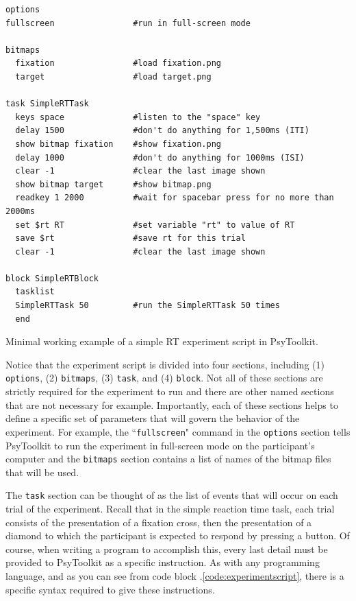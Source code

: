 \begin{tcolorbox}[every float=\centering, drop shadow,     title=The Simple RT Experiment Script]
\begin{verbatim}
options
fullscreen                #run in full-screen mode

bitmaps
  fixation                #load fixation.png
  target                  #load target.png

task SimpleRTTask
  keys space              #listen to the "space" key
  delay 1500              #don't do anything for 1,500ms (ITI)
  show bitmap fixation    #show fixation.png 
  delay 1000              #don't do anything for 1000ms (ISI)
  clear -1                #clear the last image shown
  show bitmap target      #show bitmap.png 
  readkey 1 2000          #wait for spacebar press for no more than 2000ms
  set $rt RT              #set variable "rt" to value of RT
  save $rt                #save rt for this trial
  clear -1                #clear the last image shown
  
block SimpleRTBlock
  tasklist
  SimpleRTTask 50         #run the SimpleRTTask 50 times
  end
    \end{verbatim}
\tcblower
\begin{codeblock}{Minimal working example of a simple RT experiment script in PsyToolkit.}\label{code:experimentscript}\end{codeblock}
\end{tcolorbox}
Notice that the experiment script is divided into four sections, including (1) \texttt{options}, (2) \texttt{bitmaps}, (3) \texttt{task}, and (4) \texttt{block}.  Not all of these sections are strictly required for the experiment to run and there are other named sections that are not necessary for example.  Importantly, each of these sections helps to define a specific set of parameters that will govern the behavior of the experiment.  For example, the ``\texttt{fullscreen}" command in the \texttt{options} section tells PsyToolkit to run the experiment in full-screen mode on the participant's computer and the \texttt{bitmaps} section contains a list of names of the bitmap files that will be used. 

The \texttt{task} section can be thought of as the list of events that will occur on each trial of the experiment.  Recall that in the simple reaction time task, each trial consists of the presentation of a fixation cross, then the presentation of a diamond to which the participant is expected to respond by pressing a button. Of course, when writing a program to accomplish this, every last detail must be provided to PsyToolkit as a specific instruction.  As with any programming language, and as you can see from code block \thechapter.\ref{code:experimentscript}, there is a specific syntax required to give these instructions.  

